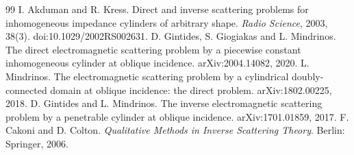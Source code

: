 \documentclass[11pt]{article}
\numberwithin{equation}{section}
\begin{document}
\begin{thebibliography}{99}
 I. Akduman and R. Kress. Direct and inverse scattering problems for inhomogeneous impedance cylinders of arbitrary shape. \emph{Radio Science}, 2003, 38(3). doi:10.1029/2002RS002631.
 D. Gintides, S. Giogiakas and L. Mindrinos. The direct electromagnetic scattering problem by a piecewise constant inhomogeneous cylinder at oblique incidence. arXiv:2004.14082, 2020.
 L. Mindrinos. The electromagnetic scattering problem by a cylindrical doubly-connected domain at oblique incidence: the direct problem. arXiv:1802.00225, 2018.
 D. Gintides and L. Mindrinos. The inverse electromagnetic scattering problem by a penetrable cylinder at oblique incidence. arXiv:1701.01859, 2017.
 F. Cakoni and D. Colton. \emph{Qualitative Methods in Inverse Scattering Theory}. Berlin: Springer, 2006.
\end{thebibliography}
\end{document}
